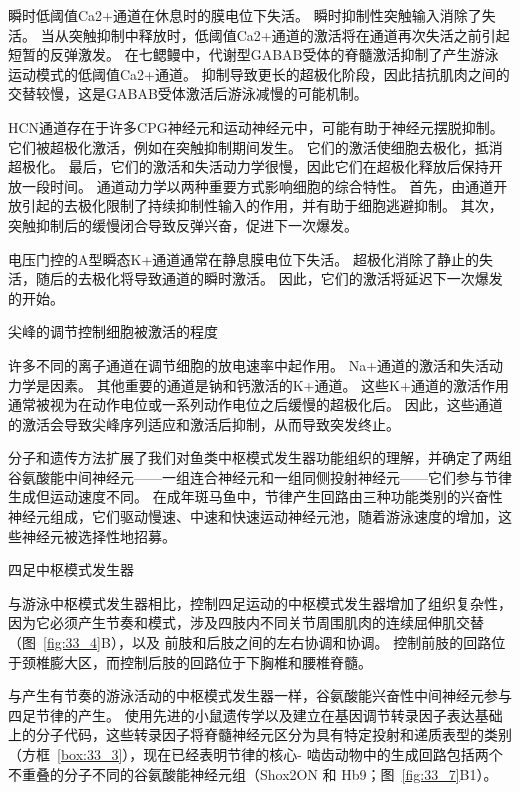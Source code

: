 \begin{proposition}[神经元离子通道有助于中枢模式发生器功能]
	\quad \quad 瞬时低阈值Ca2+通道在休息时的膜电位下失活。
	瞬时抑制性突触输入消除了失活。
	当从突触抑制中释放时，低阈值Ca2+通道的激活将在通道再次失活之前引起短暂的反弹激发。
	在七鳃鳗中，代谢型GABAB受体的脊髓激活抑制了产生游泳运动模式的低阈值Ca2+通道。
	抑制导致更长的超极化阶段，因此拮抗肌肉之间的交替较慢，这是GABAB受体激活后游泳减慢的可能机制。
	
	\quad \quad HCN通道存在于许多CPG神经元和运动神经元中，可能有助于神经元摆脱抑制。
	它们被超极化激活，例如在突触抑制期间发生。
	它们的激活使细胞去极化，抵消超极化。
	最后，它们的激活和失活动力学很慢，因此它们在超极化释放后保持开放一段时间。
	通道动力学以两种重要方式影响细胞的综合特性。
	首先，由通道开放引起的去极化限制了持续抑制性输入的作用，并有助于细胞逃避抑制。
	其次，突触抑制后的缓慢闭合导致反弹兴奋，促进下一次爆发。
	
	\quad \quad 电压门控的A型瞬态K+通道通常在静息膜电位下失活。
	超极化消除了静止的失活，随后的去极化将导致通道的瞬时激活。
	因此，它们的激活将延迟下一次爆发的开始。
	
	\quad \quad 尖峰的调节控制细胞被激活的程度
	
	\quad \quad 许多不同的离子通道在调节细胞的放电速率中起作用。
	Na+通道的激活和失活动力学是因素。
	其他重要的通道是钠和钙激活的K+通道。
	这些K+通道的激活作用通常被视为在动作电位或一系列动作电位之后缓慢的超极化后。
	因此，这些通道的激活会导致尖峰序列适应和激活后抑制，从而导致突发终止。
	
\end{proposition}


分子和遗传方法扩展了我们对鱼类中枢模式发生器功能组织的理解，并确定了两组谷氨酸能中间神经元——一组连合神经元和一组同侧投射神经元——它们参与节律生成但运动速度不同。
在成年斑马鱼中，节律产生回路由三种功能类别的兴奋性神经元组成，它们驱动慢速、中速和快速运动神经元池，随着游泳速度的增加，这些神经元被选择性地招募。


四足中枢模式发生器

与游泳中枢模式发生器相比，控制四足运动的中枢模式发生器增加了组织复杂性，因为它必须产生节奏和模式，涉及四肢内不同关节周围肌肉的连续屈伸肌交替（图~\ref{fig:33_4}B），以及 前肢和后肢之间的左右协调和协调。
控制前肢的回路位于颈椎膨大区，而控制后肢的回路位于下胸椎和腰椎脊髓。


与产生有节奏的游泳活动的中枢模式发生器一样，谷氨酸能兴奋性中间神经元参与四足节律的产生。
使用先进的小鼠遗传学以及建立在基因调节转录因子表达基础上的分子代码，这些转录因子将脊髓神经元区分为具有特定投射和递质表型的类别（方框~\ref{box:33_3}），现在已经表明节律的核心- 啮齿动物中的生成回路包括两个不重叠的分子不同的谷氨酸能神经元组（Shox2ON 和 Hb9；图~\ref{fig:33_7}B1）。



